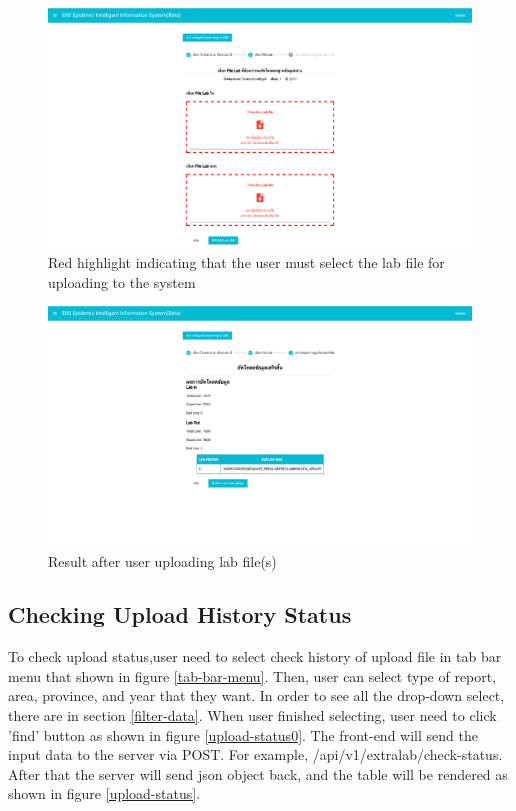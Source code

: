 	\FloatBarrier
    	\begin{figure}[h!]
            \centering
        		\includegraphics[width=12cm]{images/chapter-05/upload-error.png}
        		\caption{Red highlight indicating that the user must select the lab file for uploading to the system}
        		\label{upload-error}
        \end{figure}
	\FloatBarrier
	
	\FloatBarrier
    	\begin{figure}[h!]
            \centering
        		\includegraphics[width=12cm]{images/chapter-05/upload3.png}
        		\caption{Result after user uploading lab file(s)}
        		\label{upload-status3}
        \end{figure}
	\FloatBarrier
	
	
	\subsection{Checking Upload History Status} \label{check_upload_history_status_ui}
	
	To check upload status,user need to select check history of upload file in tab bar menu that shown in figure \ref{tab-bar-menu}. Then, user can select type of report, area, province, and year that they want. In order to see all the drop-down select, there are in section \ref{filter-data}. When user finished selecting, user need to click 'find' button as shown in figure \ref{upload-status0}. The front-end will send the input data to the server via POST. For example, /api/v1/extralab/check-status. After that the server will send json object back, and the table will be rendered as shown in figure \ref{upload-status}. 
	
